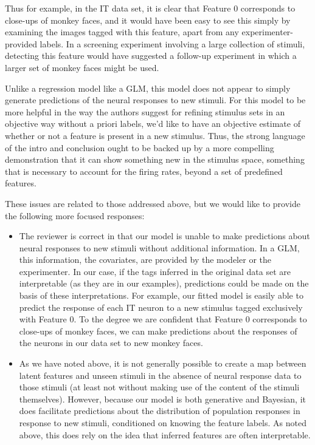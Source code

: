 \documentclass[12pt,a4paper]{article}
\newcommand{\edit}[1]{\textcolor{edit}{#1}}
\begin{document}
\edit{
Thus for example, in the IT data set, it is clear that Feature 0 corresponds to close-ups of monkey faces, and it would have been easy to see this simply by examining the images tagged with this feature, apart from any experimenter-provided labels. In a screening experiment involving a large collection of stimuli, detecting this feature would have suggested a follow-up experiment in which a larger set of monkey faces might be used.
}

Unlike a regression model like a GLM, this model does not appear to simply generate predictions of the neural responses to new stimuli. For this model to be more helpful in the way the authors suggest for refining stimulus sets in an objective way without a priori labels, we’d like to have an objective estimate of whether or not a feature is present in a new stimulus. Thus, the strong language of the intro and conclusion ought to be backed up by a more compelling demonstration that it can show something new in the stimulus space, something that is necessary to account for the firing rates, beyond a set of predefined features.

\edit{
These issues are related to those addressed above, but we would like to provide the following more focused responses:
\begin{itemize}
    \item The reviewer is correct in that our model is unable to make predictions about neural responses to new stimuli without additional information. In a GLM, this information, the covariates, are provided by the modeler or the experimenter. In our case, if the tags inferred in the original data set are interpretable (as they are in our examples), predictions could be made on the basis of these interpretations. For example, our fitted model is easily able to predict the response of each IT neuron to a new stimulus tagged exclusively with Feature 0. To the degree we are confident that Feature 0 corresponds to close-ups of monkey faces, we can make predictions about the responses of the neurons in our data set to new monkey faces.
    \item As we have noted above, it is not generally possible to create a map between latent features and unseen stimuli in the absence of neural response data to those stimuli (at least not without making use of the content of the stimuli themselves). However, because our model is both generative and Bayesian, it does facilitate predictions about the distribution of population responses in response to new stimuli, conditioned on knowing the feature labels. As noted above, this does rely on the idea that inferred features are often interpretable.
\end{itemize}
}
\end{document}
